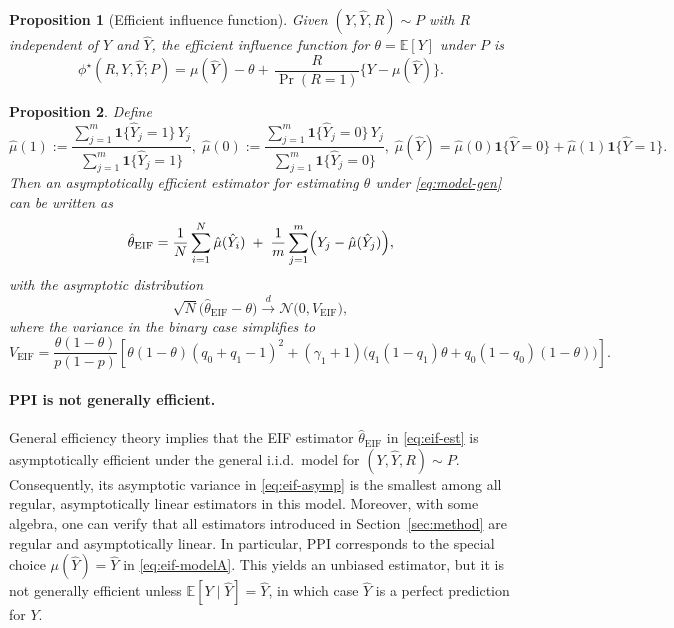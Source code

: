 \documentclass[11pt]{article}
\newcommand{\E}{\mathbb{E}}
\newcommand{\1}{\mathbf{1}}
\newtheorem{proposition}{Proposition}
\theoremstyle{remark}
\begin{document}
\begin{proposition}[Efficient influence function]
\label{prop:eif-modelA}
Given $(Y,\hat Y, R)\sim P$ with $R$ independent of $Y$ and $\hat Y$, the efficient influence function for $\theta=\E[Y]$ under $P$ is
\begin{equation}
\phi^\star(R,Y,\hat Y; P)
=
\mu(\hat Y)-\theta
+\,\frac{R}{\Pr(R=1)}\bigl\{Y-\mu(\hat Y)\bigr\}.
\label{eq:eif-modelA}
\end{equation}
\end{proposition}

\begin{proposition}
\label{prop:eif-estimator}
Define
\[
\hat\mu(1):=\frac{\sum_{j=1}^m \mathbf 1\{\hat Y_j=1\}\,Y_j}{\sum_{j=1}^m \mathbf 1\{\hat Y_j=1\}},\;
\hat\mu(0):=\frac{\sum_{j=1}^m \mathbf 1\{\hat Y_j=0\}\,Y_j}{\sum_{j=1}^m \mathbf 1\{\hat Y_j=0\}},\;
\hat\mu(\hat Y)=\hat\mu(0)\mathbf 1\{\hat Y=0\}+\hat\mu(1)\mathbf 1\{\hat Y=1\}.
\]
Then an asymptotically efficient estimator for estimating $\theta$ under \eqref{eq:model-gen} can be written as
\begin{equation}
\hat\theta_{\mathrm{EIF}}
=
\frac{1}{N}\sum_{i=1}^{N}\hat\mu(\hat Y_i)
\;+\;
\frac{1}{m}\sum_{j=1}^m\Bigl(Y_j-\hat\mu(\hat Y_j)\Bigr),
\label{eq:eif-est}
\end{equation}
with the asymptotic distribution 
\begin{equation}
\sqrt{N}\bigl(\hat\theta_{\mathrm{EIF}} - \theta\bigr) \xrightarrow{d} \mathcal{N}\bigl(0, V_{\mathrm{EIF}}\bigr),
    \end{equation}
  where the variance in the binary case simplifies to
    \begin{equation}
        \label{eq:eif-asymp}
  V_{\mathrm{EIF}} = 
  \frac{\theta(1-\theta)}{p(1-p)} \left[\theta(1-\theta)(q_0+q_1-1)^2 + {(\gamma_1+1)}\bigl(q_1(1-q_1)\theta + q_0(1-q_0)(1-\theta)\bigr)\right].
  \end{equation}
\end{proposition}
\paragraph{\textbf{PPI is not generally efficient.}}
General efficiency theory implies that the EIF estimator $\hat\theta_{\mathrm{EIF}}$ in
\eqref{eq:eif-est} is asymptotically efficient under the general i.i.d.\ model for
$(Y,\widehat Y,R) \sim P$. Consequently, its asymptotic variance in
\eqref{eq:eif-asymp} is the smallest among all regular, asymptotically linear
estimators in this model. Moreover, with some algebra, one can verify that all
estimators introduced in Section~\ref{sec:method} are regular and asymptotically
linear. In particular, PPI corresponds
to the special choice $\mu(\hat Y)= \hat Y$  in \eqref{eq:eif-modelA}. This yields an unbiased estimator, but it is not
generally efficient unless $\E[Y\mid \hat Y]=\hat Y$, in which case $\hat Y$ is a perfect prediction for $Y$.
\end{document}
